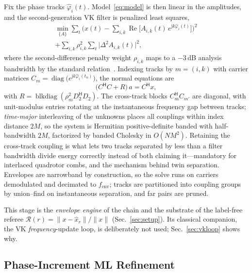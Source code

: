 \documentclass[journal]{IEEEtran}
\newcommand{\fsenv}{\ensuremath{f_{\mathrm{env}}}}
\begin{document}
Fix the phase tracks $\hat\varphi_i(t)$. Model~\eqref{eq:model} is then
linear in the amplitudes, and the second-generation VK filter is
penalized least squares,
\begin{multline}
  \min_{\{A\}} \sum_t \Big( x(t) - \sum_{i,k}
  \operatorname{Re}\big[A_{i,k}(t)\, e^{\mathrm{j}k\hat\varphi_i(t)}\big]
  \Big)^{\!2} \\
  + \sum_{i,k} \rho_{i,k}^2 \sum_t \big| \Delta^2 A_{i,k}(t) \big|^2 ,
  \label{eq:vk2}
\end{multline}
where the second-difference penalty weight $\rho_{i,k}$ maps to a
$-3$\,dB analysis bandwidth by the standard
relation~\cite{tuma2000characteristics}. Indexing tracks by $m = (i,k)$
with carrier matrices
$C_m = \operatorname{diag}\big(e^{\mathrm{j}k\hat\varphi_i(t_n)}\big)$,
the normal equations are
\begin{equation}
  \big(C^{\mathsf H}C + R\big)\, a = C^{\mathsf H} x ,
  \label{eq:normaleq}
\end{equation}
with $R = \operatorname{blkdiag}(\rho_m^2 D_2^{\mathsf H} D_2)$. The
cross-track blocks $C_m^{\mathsf H}C_{m'}$ are diagonal, with unit-modulus
entries rotating at the instantaneous frequency gap between tracks;
\emph{time-major} interleaving of the unknowns places all couplings
within index distance $2M$, so the system is Hermitian positive-definite
banded with half-bandwidth $2M$, factorized by banded Cholesky in $O(N
M^2)$. Retaining the cross-track coupling is what lets two tracks
separated by less than a filter bandwidth divide energy correctly instead
of both claiming it---mandatory for interlaced quadrotor combs, and the
mechanism behind twin separation. Envelopes are narrowband by
construction, so the solve runs on carriers demodulated and decimated to
\fsenv; tracks are partitioned into coupling groups by union--find on
instantaneous separation, and far pairs are pruned.

This stage is the \emph{envelope engine} of the chain and the substrate
of the label-free referee $\mathcal{R}(r) = \|x - \hat x_r\|/\|x\|$
(Sec.~\ref{sec:setup}). Its classical companion, the VK
\emph{frequency}-update loop, is deliberately not used;
Sec.~\ref{sec:vkloop} shows why.

\subsection{Phase-Increment ML Refinement}
\label{sec:pikalman}
\end{document}
